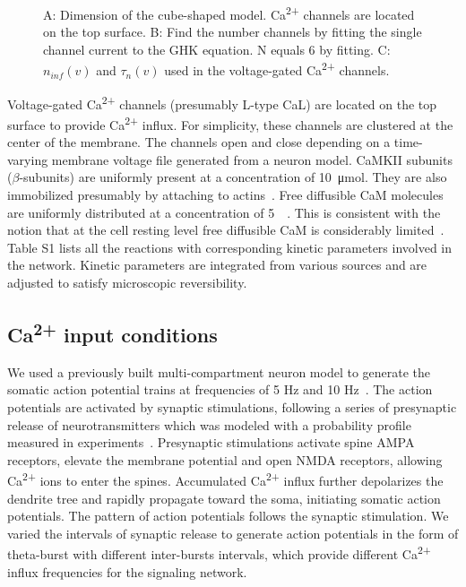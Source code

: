 \documentclass[10pt,letterpaper]{article}
\begin{document}
\begin{figure}[!h]
	\caption{{\bf}
	A: Dimension of the cube-shaped model. Ca\textsuperscript{2+} channels are located on the top surface. B: Find the number channels by fitting the single channel current to the GHK equation. N equals 6 by fitting. C: $n_{inf}(v)$ and $\tau_n(v)$ used in the voltage-gated Ca\textsuperscript{2+} channels.}
\label{fig9}
\end{figure}

Voltage-gated Ca\textsuperscript{2+} channels (presumably L-type CaL) are located on the top surface to provide Ca\textsuperscript{2+} influx. For simplicity, these channels are clustered at the center of the membrane. The channels open and close depending on a time-varying membrane voltage file generated from a neuron model. CaMKII subunits ($\beta$-subunits) are uniformly present at a concentration of \SI{10}{\umol}. They are also immobilized presumably by attaching to actins~\cite{Li:2016cq}. Free diffusible CaM molecules are uniformly distributed at a concentration of \SI{5}{\micro\Molar}. This is consistent with the notion that at the cell resting level free diffusible CaM is considerably limited~\cite{Tran:2003fs,2008BpJ....95.6002S,LubyPhelps:1995kl}. Table S1 lists all the reactions with corresponding kinetic parameters involved in the network. Kinetic parameters are integrated from various sources and are adjusted to satisfy microscopic reversibility. 

\subsection*{Ca\textsuperscript{2+} input conditions}
We used a previously built multi-compartment neuron model to generate the somatic action potential trains at frequencies of 5 Hz and 10 Hz~\cite{Li:2014fv}. The action potentials are activated by synaptic stimulations, following a series of presynaptic release of neurotransmitters which was modeled with a probability profile measured in experiments~\cite{Grover:2009hb}. Presynaptic stimulations activate spine AMPA receptors, elevate the membrane potential and open NMDA receptors, allowing Ca\textsuperscript{2+} ions to enter the spines. Accumulated Ca\textsuperscript{2+} influx further depolarizes the dendrite tree and rapidly propagate toward the soma, initiating somatic action potentials. The pattern of action potentials follows the synaptic stimulation. We varied the intervals of synaptic release to generate action potentials in the form of theta-burst with different inter-bursts intervals, which provide different Ca\textsuperscript{2+} influx frequencies for the signaling network.
\end{document}

